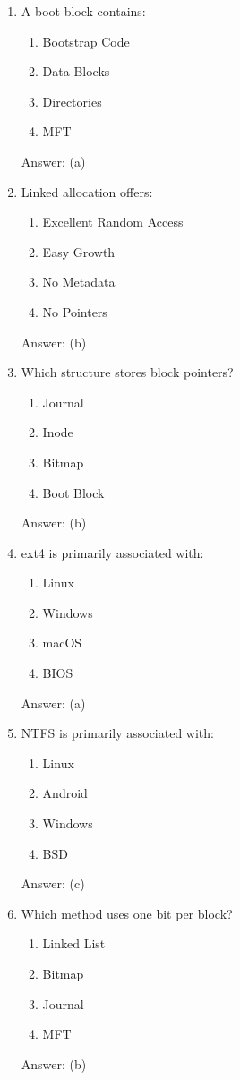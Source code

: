\begin{enumerate}
\item A boot block contains:
\begin{enumerate}[label=(\alph*)]
\item Bootstrap Code
\item Data Blocks
\item Directories
\item MFT
\end{enumerate}
Answer: (a)

\item Linked allocation offers:
\begin{enumerate}[label=(\alph*)]
\item Excellent Random Access
\item Easy Growth
\item No Metadata
\item No Pointers
\end{enumerate}
Answer: (b)

\item Which structure stores block pointers?
\begin{enumerate}[label=(\alph*)]
\item Journal
\item Inode
\item Bitmap
\item Boot Block
\end{enumerate}
Answer: (b)

\item ext4 is primarily associated with:
\begin{enumerate}[label=(\alph*)]
\item Linux
\item Windows
\item macOS
\item BIOS
\end{enumerate}
Answer: (a)

\item NTFS is primarily associated with:
\begin{enumerate}[label=(\alph*)]
\item Linux
\item Android
\item Windows
\item BSD
\end{enumerate}
Answer: (c)

\item Which method uses one bit per block?
\begin{enumerate}[label=(\alph*)]
\item Linked List
\item Bitmap
\item Journal
\item MFT
\end{enumerate}
Answer: (b)


\end{enumerate}
